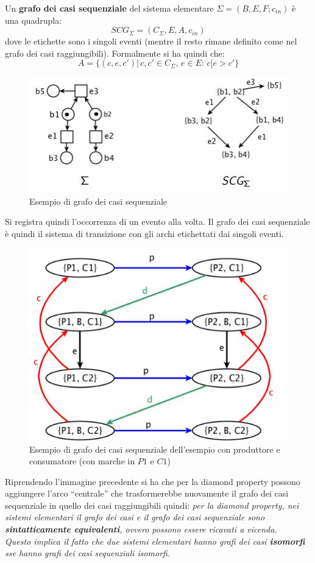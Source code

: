 \documentclass[a4paper,12pt, oneside]{book}
\begin{document}
\begin{definizione}
  Un \textbf{grafo dei casi sequenziale} del sistema elementare
  $\Sigma=(B,E,F;c_{in})$ è una quadrupla:
  \[SCG_\Sigma=(C_\Sigma,E,A,c_{in})\]
  dove le etichette sono i singoli eventi (mentre il resto rimane definito come
  nel grafo dei casi raggiungibili). Formalmente si ha quindi che:
  \[A=\{(c,e,c')|\,c,c'\in C_\Sigma,\,e\in E:\, c[e>c'\}\]
  \begin{figure}[H]
    \centering
    \includegraphics[scale = 0.6]{img/seq3.jpg}
    \caption{Esempio di grafo dei casi sequenziale}
  \end{figure}
  Si registra quindi l'occorrenza di un evento alla volta. Il grafo dei casi
  sequenziale è quindi il sistema di transizione con gli archi etichettati dai
  singoli eventi.
  \begin{figure}[H]
    \centering
    \includegraphics[scale = 0.4]{img/seqq.jpg}
    \caption{Esempio di grafo dei casi sequenziale dell'esempio con produttore
      e consumatore (con marche in $P1$ e $C1$)}
  \end{figure}
\end{definizione}
Riprendendo l'immagine precedente si ha che per la diamond property possono
aggiungere l'arco ``centrale'' che trasformerebbe nuovamente il grafo dei casi
sequenziale in quello dei casi raggiungibili quindi:
\textit{per la diamond property, nei sistemi elementari il grafo dei casi e il
  grafo dei casi sequenziale sono \textbf{sintatticamente equivalenti}, ovvero
  possono essere ricavati a vicenda.\\
  Questo implica il fatto che due sistemi elementari hanno grafi dei casi
  \textbf{isomorfi} sse hanno grafi dei casi sequenziali isomorfi.}
\end{document}
